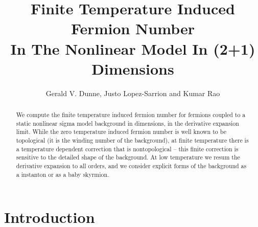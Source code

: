 \documentclass[a4paper,prd]{revtex4}
\begin{document}
\title{Finite Temperature Induced Fermion Number\\ In 
The Nonlinear \myHighlight{$\sigma $}\coordHE{} Model In (2+1) Dimensions }


\author{Gerald V. Dunne\coordHE{}, Justo Lopez-Sarrion\coordHE{} and Kumar Rao\coordHE{}}




\begin{abstract}
We compute the finite temperature induced fermion number for fermions coupled to
a static nonlinear sigma model background in \coordHE{} dimensions, in the derivative
expansion limit. While the zero temperature induced fermion number is well
known to be topological (it is the winding number of the background), at finite
temperature there is a temperature dependent correction that is nontopological --
this finite \coordHE{} correction is sensitive to the detailed shape of the
background. At low temperature we resum the derivative expansion to all orders, and
we consider explicit forms of the background as a \coordHE{} instanton or as
a baby skyrmion.

\end{abstract}

\maketitle


\section{Introduction}
\end{document}
